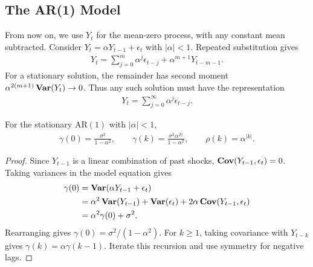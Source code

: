 \documentclass[a4paper,12pt]{article}
\begin{document}
\subsection{The AR(1) Model}

From now on, we use $Y_t$ for the mean-zero process, with any constant mean subtracted.
Consider $Y_t=\alpha Y_{t-1}+\epsilon_t$ with $|\alpha|<1$.
Repeated substitution gives
\begin{align}
	Y_t=\sum_{j=0}^{m}\alpha^j\epsilon_{t-j}+\alpha^{m+1}Y_{t-m-1}.
\end{align}
For a stationary solution, the remainder has second moment
$\alpha^{2(m+1)}\operatorname{\text{\textrm{\upshape\textbf{Var}}}}(Y_t)\to0$.
Thus any such solution must have the representation
\begin{align}\label{eq-ar1-linear}
	Y_t=\sum_{j=0}^{\infty}\alpha^j\epsilon_{t-j}.
\end{align}

\begin{proposition}
	For the stationary $\mathrm{AR}(1)$ with $|\alpha|<1$,
	\begin{align}
		\gamma(0)=\frac{\sigma^2}{1-\alpha^2},\qquad
		\gamma(k)=\frac{\sigma^2\alpha^{|k|}}{1-\alpha^2},\qquad
		\rho(k)=\alpha^{|k|}.
	\end{align}
\end{proposition}
\begin{proof}
	Since $Y_{t-1}$ is a linear combination of past shocks,
	$\operatorname{\text{\textrm{\upshape\textbf{Cov}}}}(Y_{t-1},\epsilon_t)=0$.
	Taking variances in the model equation gives
	\begin{align*}
		\gamma(0)
		&=\operatorname{\text{\textrm{\upshape\textbf{Var}}}}(\alpha Y_{t-1}+\epsilon_t)\\
		&=\alpha^2\operatorname{\text{\textrm{\upshape\textbf{Var}}}}(Y_{t-1})+\operatorname{\text{\textrm{\upshape\textbf{Var}}}}(\epsilon_t)
		+2\alpha\operatorname{\text{\textrm{\upshape\textbf{Cov}}}}(Y_{t-1},\epsilon_t)\\
		&=\alpha^2\gamma(0)+\sigma^2.
	\end{align*}
	Rearranging gives $\gamma(0)=\sigma^2/(1-\alpha^2)$.
	For $k\ge1$, taking covariance with $Y_{t-k}$ gives $\gamma(k)=\alpha\gamma(k-1)$.
	Iterate this recursion and use symmetry for negative lags.
\end{proof}
\end{document}
